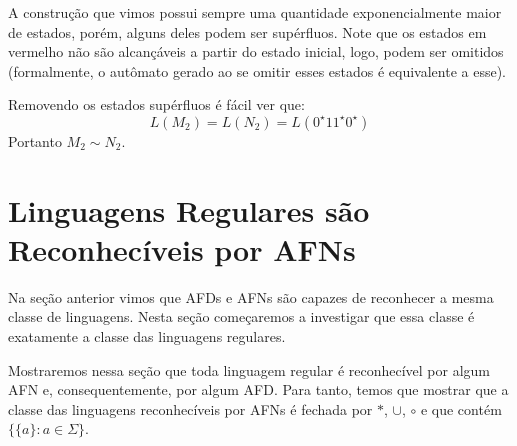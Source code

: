 \begin{example}
A construção que vimos possui sempre uma quantidade exponencialmente maior de estados, porém, alguns deles podem ser supérfluos.
Note que os estados em vermelho não são alcançáveis a partir do estado inicial, logo, podem ser omitidos (formalmente, o autômato gerado ao se omitir esses estados é equivalente a esse).

 \begin{center}
  \end{center}

  Removendo os estados supérfluos é fácil ver que:
  \begin{displaymath}
    L(M_2) = L(N_2) = L(0^\star11^\star0^\star)
  \end{displaymath}
  Portanto $M_2 \sim N_2$.
\end{example}


\section{Linguagens Regulares são Reconhecíveis por AFNs}
\label{sec:rg-afn}

Na seção anterior vimos que AFDs e AFNs são capazes de reconhecer a mesma classe de linguagens.
Nesta seção começaremos a investigar que essa classe é exatamente a classe das linguagens regulares.

Mostraremos nessa seção que toda linguagem regular é reconhecível por algum AFN e, consequentemente, por algum AFD.
Para tanto, temos que mostrar que a classe das linguagens reconhecíveis por AFNs é fechada por $*$, $\cup$, $\circ$ e que contém $\{\{a\} : a \in \Sigma\}$.


